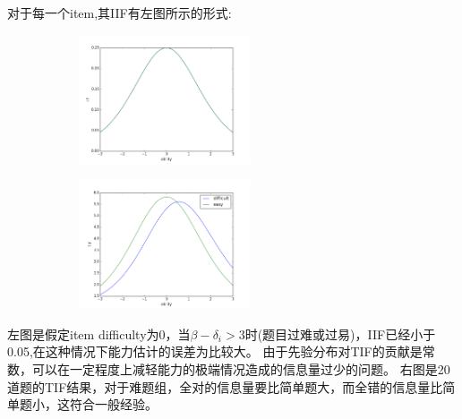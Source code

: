 \documentclass[xetex,mathserif,serif]{beamer}
\begin{document}
   \begin{frame}
    
    对于每一个item,其IIF有左图所示的形式:
    \begin{figure}
 \begin{subfigure}{.5\textwidth}
  \centering
  \includegraphics[height=1.5in]{IIF.png}
 \end{subfigure}%
\begin{subfigure}{.5\textwidth}
  \centering
  \includegraphics[height=1.5in]{TIF.png}
 \end{subfigure}
\end{figure}

左图是假定item difficulty为0，当$\beta-\delta_i>3$时(题目过难或过易)，IIF已经小于0.05,在这种情况下能力估计的误差为比较大。
由于先验分布对TIF的贡献是常数，可以在一定程度上减轻能力的极端情况造成的信息量过少的问题。 右图是20道题的TIF结果，对于难题组，全对的信息量要比简单题大，而全错的信息量比简单题小，这符合一般经验。

  \end{frame}
\end{document}
